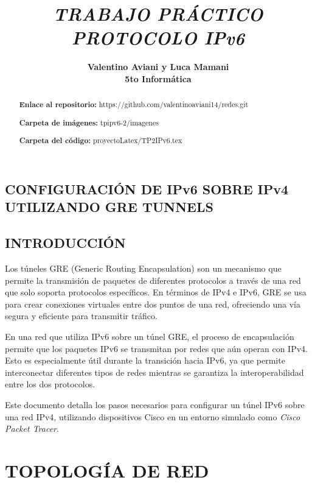 \documentclass[12pt]{article}
\title{\textbf{\textit{TRABAJO PRÁCTICO PROTOCOLO IPv6}}}
\author{\textbf{Valentino Aviani y Luca Mamani} \\ \textbf{5to Informática}}
\begin{document}
	
	\maketitle 
	
	\begin{abstract}
		\textbf{Enlace al repositorio:} https://github.com/valentinoaviani14/redes.git 
		
		\textbf{Carpeta de imágenes:} tpipv6-2/imagenes
		
		\textbf{Carpeta del código:} proyectoLatex/TP2IPv6.tex
	\end{abstract}
	
	\tableofcontents
	
	\newpage  %
	
	\begin{center}
		\section{CONFIGURACIÓN DE IPv6 SOBRE IPv4 UTILIZANDO GRE TUNNELS}
	\end{center}
	
	\subsection{INTRODUCCIÓN}
	{\large Los túneles GRE (Generic Routing Encapsulation) son un mecanismo que permite la transmisión de paquetes de diferentes protocolos a través de una red que solo soporta protocolos específicos. En términos de IPv4 e IPv6, GRE se usa para crear conexiones virtuales entre dos puntos de una red, ofreciendo una vía segura y eficiente para transmitir tráfico.}
	
	{\large En una red que utiliza IPv6 sobre un túnel GRE, el proceso de encapsulación permite que los paquetes IPv6 se transmitan por redes que aún operan con IPv4. Esto es especialmente útil durante la transición hacia IPv6, ya que permite interconectar diferentes tipos de redes mientras se garantiza la interoperabilidad entre los dos protocolos.}
	
	{\large Este documento detalla los pasos necesarios para configurar un túnel IPv6 sobre una red IPv4, utilizando dispositivos Cisco en un entorno simulado como \textit{Cisco Packet Tracer}.}
	
	\section{TOPOLOGÍA DE RED}
	
\end{document}
